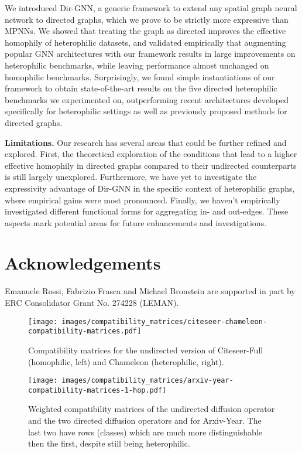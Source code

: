 \documentclass{article}
\newcommand\oursacro{Dir-GNN}
\theoremstyle{plain}
\theoremstyle{definition}
\theoremstyle{remark}
\begin{document}
We introduced \oursacro, a generic framework to extend any spatial graph neural network to directed graphs, which we prove to be strictly more expressive than MPNNs. We showed that treating the graph as directed improves the effective homophily of heterophilic datasets, and validated empirically that augmenting popular GNN architectures with our framework results in large improvements on heterophilic benchmarks, while leaving performance almost unchanged on homophilic benchmarks. Surprisingly, we found simple instantiations of our framework to obtain state-of-the-art results on the five directed heterophilic benchmarks we experimented on, outperforming recent architectures developed specifically for heterophilic settings as well as previously proposed methods for directed graphs.

\textbf{Limitations.} Our research has several areas that could be further refined and explored. First, the theoretical exploration of the conditions that lead to a higher effective homophily in directed graphs compared to their undirected counterparts is still largely unexplored. Furthermore, we have yet to investigate the expressivity advantage of \oursacro{} in the specific context of heterophilic graphs, where empirical gains were most pronounced.  Finally, we haven't empirically investigated different functional forms for aggregating in- and out-edges. These aspects mark potential areas for future enhancements and investigations.  
\section*{Acknowledgements}
Emanuele Rossi, Fabrizio Frasca and Michael Bronstein are supported in part by ERC Consolidator Grant No. 274228 (LEMAN).




\appendix
{}
\newpage



\begin{figure}
    \centering
    \texttt{[image: images/compatibility\_matrices/citeseer-chameleon-compatibility-matrices.pdf]}
    \caption{Compatibility matrices for the undirected version of Citeseer-Full (homophilic, left) and Chameleon (heterophilic, right).}
    \label{fig:citeseer_chameleon_compat}
\end{figure}

\begin{figure*}
    \centering
    \texttt{[image: images/compatibility\_matrices/arxiv-year-compatibility-matrices-1-hop.pdf]}
    \caption{Weighted compatibility matrices of the undirected diffusion operator  and the two directed diffusion operators  and  for Arxiv-Year. The last two have rows (classes) which are much more distinguishable then the first, despite still being heterophilic.}
    \label{fig:arxiv-year-compat}
\end{figure*}
\end{document}

